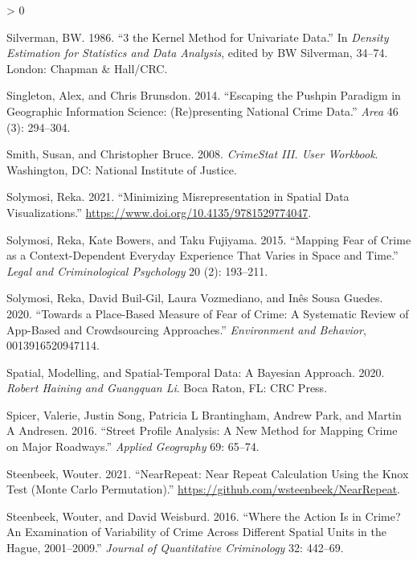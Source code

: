 \documentclass[
  krantz2]{krantz}
\newlength{\cslhangindent}
\newenvironment{CSLReferences}[2] %
 {%
  \setlength{\parindent}{0pt}
  \ifodd #1 \everypar{\setlength{\hangindent}{\cslhangindent}}\ignorespaces\fi
  \ifnum #2 > 0
  \setlength{\parskip}{#2\baselineskip}
  \fi
 }%
 {}
\begin{document}
\begin{CSLReferences}{1}{0}
\leavevmode\hypertarget{ref-Silverman_1986}{}%
Silverman, BW. 1986. {``3 the Kernel Method for Univariate Data.''} In \emph{Density Estimation for Statistics and Data Analysis}, edited by BW Silverman, 34--74. London: Chapman \& Hall/CRC.

\leavevmode\hypertarget{ref-Singleton_2014}{}%
Singleton, Alex, and Chris Brunsdon. 2014. {``Escaping the Pushpin Paradigm in Geographic Information Science: (Re)presenting National Crime Data.''} \emph{Area} 46 (3): 294--304.

\leavevmode\hypertarget{ref-Smith_2008}{}%
Smith, Susan, and Christopher Bruce. 2008. \emph{CrimeStat III. User Workbook}. Washington, DC: National Institute of Justice.

\leavevmode\hypertarget{ref-Solymosi_2021}{}%
Solymosi, Reka. 2021. {``Minimizing Misrepresentation in Spatial Data Visualizations.''} \url{https://www.doi.org/10.4135/9781529774047}.

\leavevmode\hypertarget{ref-Solymosi_2015}{}%
Solymosi, Reka, Kate Bowers, and Taku Fujiyama. 2015. {``Mapping Fear of Crime as a Context-Dependent Everyday Experience That Varies in Space and Time.''} \emph{Legal and Criminological Psychology} 20 (2): 193--211.

\leavevmode\hypertarget{ref-Solymosi_2020}{}%
Solymosi, Reka, David Buil-Gil, Laura Vozmediano, and Inês Sousa Guedes. 2020. {``Towards a Place-Based Measure of Fear of Crime: A Systematic Review of App-Based and Crowdsourcing Approaches.''} \emph{Environment and Behavior}, 0013916520947114.

\leavevmode\hypertarget{ref-Haining_2020}{}%
Spatial, Modelling, and Spatial-Temporal Data: A Bayesian Approach. 2020. \emph{Robert Haining and Guangquan Li}. Boca Raton, FL: CRC Press.

\leavevmode\hypertarget{ref-Spicer_2016}{}%
Spicer, Valerie, Justin Song, Patricia L Brantingham, Andrew Park, and Martin A Andresen. 2016. {``Street Profile Analysis: A New Method for Mapping Crime on Major Roadways.''} \emph{Applied Geography} 69: 65--74.

\leavevmode\hypertarget{ref-Steenbeek_2021}{}%
Steenbeek, Wouter. 2021. {``NearRepeat: Near Repeat Calculation Using the Knox Test (Monte Carlo Permutation).''} \url{https://github.com/wsteenbeek/NearRepeat}.

\leavevmode\hypertarget{ref-Steenbeek_2016}{}%
Steenbeek, Wouter, and David Weisburd. 2016. {``Where the Action Is in Crime? An Examination of Variability of Crime Across Different Spatial Units in the Hague, 2001--2009.''} \emph{Journal of Quantitative Criminology} 32: 442--69.


\end{CSLReferences}
\end{document}

